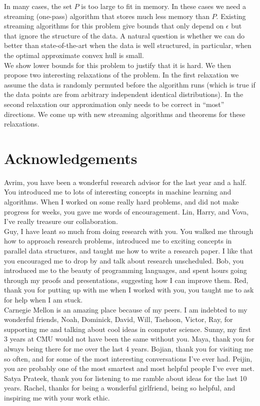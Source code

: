 \documentclass[12pt]{report}
\theoremstyle{definition}
\theoremstyle{lemma}
\theoremstyle{theorem}
\theoremstyle{corollary}
\begin{document}
In many cases, the set $P$ is too large to fit in memory. In these cases we need a streaming (one-pass) algorithm that stores much less memory than $P$. Existing streaming algorithms for this problem give bounds that only depend on $\epsilon$ but that ignore the structure of the data. A natural question is whether we can do better than state-of-the-art when the data is well structured, in particular, when the optimal approximate convex hull is small. 
\\

We show lower bounds for this problem to justify that it is hard. We then propose two interesting relaxations of the problem. In the first relaxation we assume the data is randomly permuted before the algorithm runs (which is true if the data points are from arbitrary independent identical distributions). In the second relaxation our approximation only needs to be correct in “most” directions. We come up with new streaming algorithms and theorems for these relaxations. 

\chapter*{Acknowledgements}

Avrim, you have been a wonderful research advisor for the last year and a half. You introduced me to lots of interesting concepts in machine learning and algorithms. When I worked on some really hard problems, and did not make progress for weeks, you gave me words of encouragement. Lin, Harry, and Vova, I've really treasure our collaboration.
\\

Guy, I have leant so much from doing research with you. You walked me through how to approach research problems, introduced me to exciting concepts in parallel data structures, and taught me how to write a research paper. I like that you encouraged me to drop by and talk about research unscheduled. Bob, you introduced me to the beauty of programming languages, and spent hours going through my proofs and presentations, suggesting how I can improve them. Red, thank you for putting up with me when I worked with you, you taught me to ask for help when I am stuck.
\\

Carnegie Mellon is an amazing place because of my peers. I am indebted to my wonderful friends, Noah, Dominick, David, Will, Taehoon, Victor, Ray, for supporting me and talking about cool ideas in computer science. Sunny, my first 3 years at CMU would not have been the same without you. Maya, thank you for always being there for me over the last 4 years. Bojian, thank you for visiting me so often, and for some of the most interesting conversations I've ever had. Peijin, you are probably one of the most smartest and most helpful people I've ever met. Satya Prateek, thank you for listening to me ramble about ideas for the last 10 years. Rachel, thanks for being a wonderful girlfriend, being so helpful, and inspiring me with your work ethic.
\\
\end{document}
